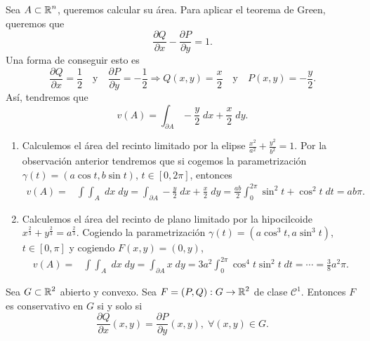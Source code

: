 \begin{observation}
	Sea $\displaystyle A \subset \mathbb{R}^{n} $, queremos calcular su área. Para aplicar el teorema de Green, queremos que 
	\[\frac{\partial Q}{\partial x}- \frac{\partial P}{\partial y}= 1 .\]
	Una forma de conseguir esto es
	\[\frac{\partial Q}{\partial x}=\frac{1}{2} \quad \text{y} \quad \frac{\partial P}{\partial y}=-\frac{1}{2} \Rightarrow Q\left(x,y\right)=\frac{x}{2} \quad \text{y} \quad P\left(x,y\right)=-\frac{y}{2} .\]
	Así, tendremos que 
	\[v\left(A\right)=\int _{\partial A}-\frac{y}{2} \; dx + \frac{x}{2} \; dy .\]
\end{observation}
\begin{eg}
\begin{enumerate}
	\item Calculemos el área del recinto limitado por la elipse $\displaystyle \frac{x^{2}}{a^{2}}+ \frac{y^{2}}{b^{2}}=1 $. Por la observación anterior tendremos que si cogemos la parametrización $\displaystyle \gamma\left(t\right)=\left(a\cos t, b \sin t\right) $, $\displaystyle t \in \left[0, 2\pi \right]  $, entonces
	\[
	\begin{split}
		v\left(A\right) = & \int \int _{A} \; dx \; dy = \int _{\partial A}-\frac{y}{2} \; dx + \frac{x}{2}\; dy = \frac{ab}{2}\int^{2\pi }_{0}  \sin ^{2}t + \cos ^{2}t\; dt = ab\pi .
	\end{split}
	\]
\item Calculemos el área del recinto de plano limitado por la hipocilcoide $\displaystyle x^{\frac{2}{3}}+y^{\frac{2}{3}}=a^{\frac{2}{3}} $. Cogiendo la parametrización $\displaystyle \gamma\left(t\right)=\left(a\cos ^{3}t, a \sin ^{3}t\right) $, $\displaystyle t \in \left[0,\pi \right]  $ y cogiendo $\displaystyle F\left(x,y\right)=\left(0,y\right) $,
\[
\begin{split}
	v\left(A\right)= & \int \int _{A} \; dx \; dy = \int _{\partial A}x \; dy = 3a^{2}\int^{2\pi }_{0} \cos ^{4}t \sin ^{2}t \; dt = \cdots = \frac{3}{8}a^{2}\pi .
\end{split}
\]
\end{enumerate}
\end{eg}
\begin{theorem}
Sea $\displaystyle G \subset \mathbb{R}^{2} $ abierto y convexo. Sea $\displaystyle F = \left(P, Q\right) : G \to \mathbb{R}^{2} $ de clase $\displaystyle \mathcal{C}^{1} $. Entonces $\displaystyle F $ es conservativo en $\displaystyle G $ si y solo si 
\[\frac{\partial Q}{\partial x}\left(x,y\right)=\frac{\partial P}{\partial y}\left(x,y\right), \; \forall \left(x,y\right)\in G .\]
\end{theorem}
